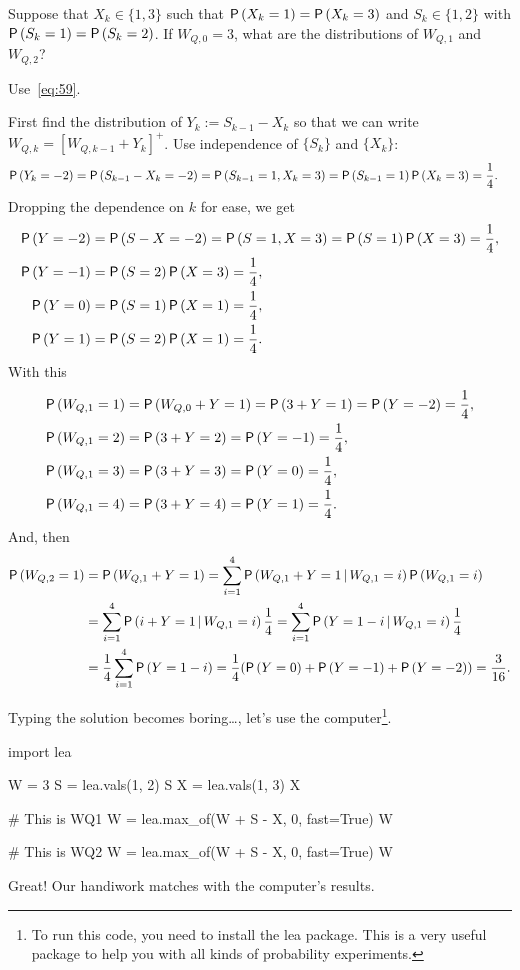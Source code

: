 \begin{extra}
  Suppose that $X_k\in\{1,3\}$ such that $\P{X_k=1}=\P{X_k=3}$ and
  $S_k\in\{1,2\}$ with $\P{S_k=1}=\P{S_k=2}$. If $W_{Q,0}=3$, what are
  the distributions of $W_{Q,1}$ and $W_{Q,2}$?  
  \begin{hint}
Use~\cref{eq:59}.
\end{hint}
\begin{solution}  First find the distribution of $Y_k:=S_{k-1}-X_k$ so that we can write
  $W_{Q,k}=[W_{Q,k-1}+Y_k]^+$.  Use independence of $\{S_k\}$ and $\{X_k\}$:
\begin{align*}
  \P{Y_k=-2} &=\P{S_{k-1}-X_k=-2} = \P{S_{k-1}=1, X_k=3} = \P{S_{k-1}=1}\P{X_k=3} = \frac14.
\end{align*}
Dropping the dependence on $k$ for ease, we get
\begin{align*}
  \P{Y=-2} &=\P{S-X=-2} = \P{S=1, X=3} = \P{S=1}\P{X=3} = \frac14,\\
  \P{Y=-1} &=\P{S=2}\P{X=3} = \frac14,\\
  \P{Y=0} &=\P{S=1}\P{X=1} = \frac14,\\
  \P{Y=1} &=\P{S=2}\P{X=1} = \frac14.
\end{align*}
With this
  \begin{align*}
    \P{W_{Q,1} = 1} &=\P{W_{Q,0} + Y= 1} = \P{3 + Y =1} = \P{Y=-2} =\frac14,\\
    \P{W_{Q,1} = 2} &= \P{3 + Y =2} = \P{Y=-1}  =\frac14,\\
    \P{W_{Q,1} = 3} &= \P{3 + Y = 3} = \P{Y=0}  =\frac14,\\
    \P{W_{Q,1} = 4} &= \P{3 + Y = 4} = \P{Y=1}  =\frac14.\\
  \end{align*}
And, then
  \begin{equation*}
    \begin{split}
    \P{W_{Q,2} = 1} 
&=\P{W_{Q,1} + Y = 1} = \sum_{i=1}^4 \P{W_{Q,1} + Y = 1\given W_{Q,1}=i}\P{W_{Q,1}=i}\\
&=\sum_{i=1}^4 \P{i + Y = 1\given W_{Q,1}=i}\frac14
=\sum_{i=1}^4 \P{Y = 1-i\given W_{Q,1}=i}\frac14\\
&=\frac14\sum_{i=1}^4 \P{Y = 1-i} = \frac14(\P{Y = 0} + \P{Y=-1} +\P{Y=-2}) = \frac{3}{16}.
    \end{split}
  \end{equation*}

Typing the solution becomes  boring\ldots, let's use the computer\footnote{To run this code, you need to install the lea package. This is a very useful package to help you with all kinds of probability experiments.}.

\begin{pyconsole}
import lea

W = 3
S = lea.vals(1,  2)
S
X = lea.vals(1,  3)
X

# This is WQ1
W = lea.max_of(W + S - X, 0, fast=True)
W

# This is WQ2
W = lea.max_of(W + S - X, 0, fast=True)
W
\end{pyconsole}
Great! Our handiwork matches with the computer's results. 

\end{solution}
\end{extra}
